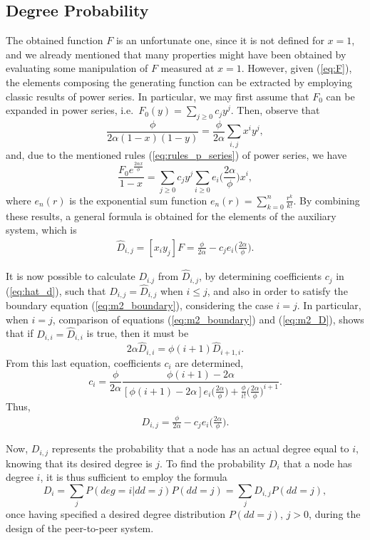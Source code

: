 \documentclass[a4paper,twosided]{article}
\begin{document}
\subsection{Degree Probability}

The obtained function $F$ is an unfortunate one, since it is not defined for $x=1$, and we already mentioned that many properties might have been obtained by evaluating some manipulation of $F$ measured at $x=1$. However, given (\ref{eq:F}), the elements composing the generating function can be extracted by employing classic results of power series.
In particular, we may first assume that $F_0$ can be expanded in power series, i.e.~$F_0(y) = \sum_{j \geq 0} c_j y^j.$
Then, observe that
$$ \frac{\textstyle \phi}{\textstyle 2\alpha (1-x)(1-y)} = \frac{\phi}{2\alpha} \sum_{i,j} x^i y^j,$$
and, due to the mentioned rules (\ref{eq:rules_p_series}) of power series, we have
$$ \frac{F_0 e^{\frac{2\alpha x}{\phi}}}{1-x} = \sum_{j \geq 0} c_j y^j \sum_{i \geq 0} e_i\Big(\frac{2 \alpha}{\phi}\Big) 
x^i,$$
where $e_n(r)$ is the exponential sum function $e_n(r) = \sum_{k=0}^n \frac{r^k}{k!}$.
By combining these results, a general formula is obtained for the elements of the auxiliary system, which is
\begin{eqnarray}
\hat{D}_{i,j} = [x_i y_j]F = \frac{\phi}{2 \alpha} - c_j e_i\Big(\frac{2 \alpha}{\phi}\Big).
\label{eq:hat_d}
\end{eqnarray}

It is now possible to calculate $D_{i.j}$ from $\hat{D}_{i,j}$, by determining coefficients $c_j$ in (\ref{eq:hat_d}), such that $D_{i,j}=\hat{D}_{i,j}$ when $i\leq j$, and also in order to satisfy the boundary equation (\ref{eq:m2_boundary}), considering the case $i=j$. In particular, when $i=j$, comparison of equations (\ref{eq:m2_boundary}) and (\ref{eq:m2_D}), shows that if $D_{i,i}=\hat{D}_{i,i}$ is true, then it must be 
$$2 \alpha \hat{D}_{i,i} = \phi (i+1) \hat{D}_{i+1,i}.$$
From this last equation, coefficients $c_i$ are determined,
$$c_i = \frac{\phi}{2 \alpha} \frac{\phi(i+1) - 2 \alpha}{[\phi(i+1) - 2 \alpha] e_i\Big(\frac{2 \alpha}{\phi}\Big) + \frac{\phi}{i!} \Big(\frac{2 \alpha}{\phi}\Big)^{i+1}}.$$
Thus,
\begin{eqnarray}
D_{i,j} = \frac{\phi}{2 \alpha} - c_j e_i\Big(\frac{2 \alpha}{\phi}\Big).
\label{eq:m2_d}
\end{eqnarray}

Now, $D_{i,j}$ represents the probability that a node has an actual degree equal to $i$, knowing that its desired degree is $j$. To find the probability $D_i$ that a node has degree $i$, it is thus sufficient to employ the formula
$$ D_i = \sum_j P(deg=i | dd=j) P(dd=j) = \sum_j D_{i,j} P(dd=j),$$
once having specified a desired degree distribution $P(dd=j)$, $j>0$, during the design of the peer-to-peer system.
\end{document}
